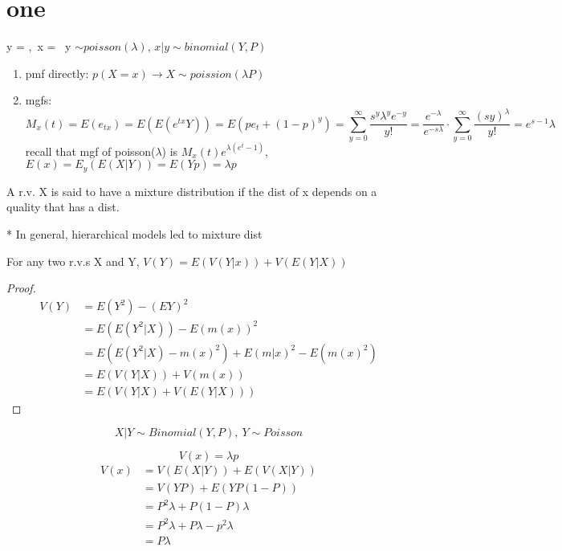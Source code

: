 \documentclass{article}
\begin{document}
\section{one}
\begin{example}
    y = ,\ 
    x = \ 
    y $\sim poisson(\lambda)$, $x|y\sim binomial(Y,P)$ 
\end{example}

\begin{enumerate}
    \item pmf directly: $p(X=x)\to X\sim poission(\lambda P)$ 
    \item mgfs: \[
    M_{x}(t)=E(e_{tx})=E(E(e^{tx}Y))=E(pe_{t}+(1-p)^{y})=\sum_{y=0}^{\infty} \frac{s^{y}\lambda^{y}e^{-y}}{y!}=\frac{e^{-\lambda}}{e^{-s\lambda}}\cdot
    \sum_{y=0}^{\infty} \frac{(sy)^{\lambda}}{y!}=e^{s-1}\lambda
    \]  
    recall that mgf of poisson($\lambda$) is $M_{x}(t)e^{\lambda (e^{t}-1)}$, $E(x)=E_{y}(E(X|Y))=E(Yp)=\lambda p$
\end{enumerate}

\begin{definition}
    A r.v. X is said to have a mixture distribution if the dist of x depends on a quality that has a dist. 
\end{definition}
* In general, hierarchical models led to mixture dist

\begin{theorem}
    For any two r.v.s X and Y, $V(Y)=E(V(Y|x))+V(E(Y|X)) $ 
\end{theorem}

\begin{proof}
    \begin{align*}
    V(Y)&=E(Y^{2})-(EY)^{2}\\
    &= E(E(Y^{2}|X))-E(m(x))^{2} \\
    &= E(E(Y^{2}|X)-m(x)^{2})+E(m|x)^{2}-E(m(x)^{2}) \\
    &= E(V(Y|X))+V(m(x)) \\
    &= E(V(Y|X)+V(E(Y|X)))
\end{align*}

\end{proof}


\begin{example}
    \[
    X|Y\sim Binomial(Y,P),\ 
    Y\sim Poisson 
    \] 
\end{example}
\[
V(x)=\lambda p
\]
\begin{align*}
   V(x)&=V(E(X|Y))+E(V(X|Y))\\
   &=V(YP)+E(YP(1-P)) \\
   &= P^{2}\lambda+P(1-P)\lambda \\
   &= P^{2}\lambda+P\lambda-p^{2}\lambda \\
   &= P\lambda \\
\end{align*}
\end{document}
